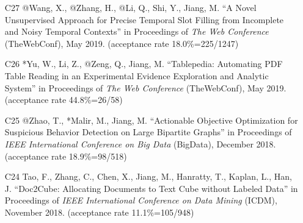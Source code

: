 \documentclass[10pt]{article}
\newenvironment{myindentpar}[1]%
{\begin{list}{}%
         {\setlength{\leftmargin}{#1}}%
         \item[]%
}
{\end{list}}
\newcounter{list}
\begin{document}
\begin{myindentpar}{0.00cm}
\begin{enumerate}[leftmargin=.5cm]
\vspace{-0.1cm}

\item[C27] @Wang, X., @Zhang, H., @Li, Q., Shi, Y., Jiang, M. ``A Novel Unsupervised Approach for Precise Temporal Slot Filling from Incomplete and Noisy Temporal Contexts'' in Proceedings of \emph{The Web Conference } (TheWebConf), May 2019. (acceptance rate 18.0\%=225/1247)

\vspace{-0.1cm}

\item[C26] *Yu, W., Li, Z., @Zeng, Q., Jiang, M. ``Tablepedia: Automating PDF Table Reading in an Experimental Evidence Exploration and Analytic System'' in Proceedings of \emph{The Web Conference } (TheWebConf), May 2019. (acceptance rate 44.8\%=26/58)

\vspace{-0.1cm}

\item[C25] @Zhao, T., *Malir, M., Jiang, M. ``Actionable Objective Optimization for Suspicious Behavior Detection on Large Bipartite Graphs'' in Proceedings of \emph{IEEE International Conference on Big Data} (BigData), December 2018. (acceptance rate 18.9\%=98/518)

\vspace{-0.1cm}

\item[C24] Tao, F., Zhang, C., Chen, X., Jiang, M., Hanratty, T., Kaplan, L., Han, J. ``Doc2Cube: Allocating Documents to Text Cube without Labeled Data'' in Proceedings of \emph{IEEE International Conference on Data Mining } (ICDM), November 2018. (acceptance rate 11.1\%=105/948)


\end{enumerate}
\end{myindentpar}
\end{document}
